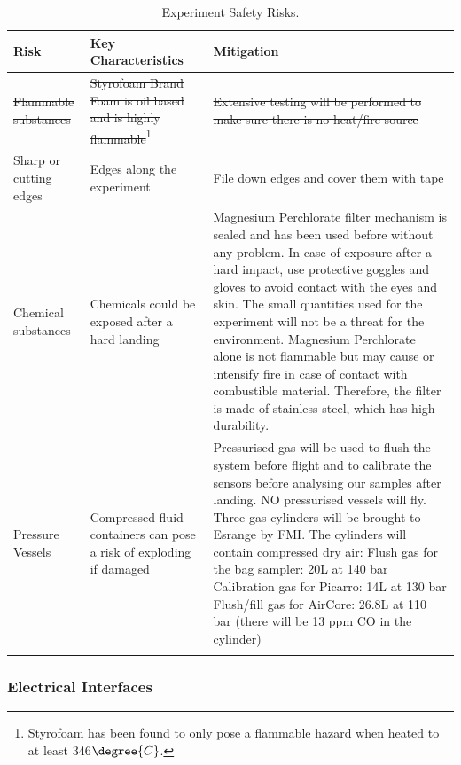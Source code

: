 \documentclass[a4paper,12pt,oneside]{article}
\providecommand{\DIFaddend}{} %
\DeclareRobustCommand{\DIFaddend}{\DIFOaddend \let\includegraphics\DIFOincludegraphics} %
\begin{document}
\DIFaddend \begin{longtable}{|m{}|m{}|m{}|}
\hline
\textbf{Risk} & \textbf{Key Characteristics} & \textbf{Mitigation}                                                           \\ \hline
\st{Flammable substances}    & \st{Styrofoam Brand Foam is oil based and is highly flammable}\footnote{Styrofoam has been found to only pose a flammable hazard when heated to at least 346$\degree{C}$.\cite{dowsverige}\label{fn:keychar}} & \st{Extensive testing will be performed to make sure there is no heat/fire source} \\ \hline
Sharp or cutting edges & Edges along the experiment                                & File down edges and cover them with tape                                                              \\ \hline
Chemical substances & Chemicals could be exposed after a hard landing & Magnesium Perchlorate filter mechanism is sealed and has been used before without any problem. In case of exposure after a hard impact, use protective goggles and gloves to avoid contact with the eyes and skin. The small quantities used for the experiment will not be a threat for the environment. Magnesium Perchlorate alone is not flammable but may cause or intensify fire in case of contact with combustible material. Therefore, the filter is made of stainless steel, which has high durability.       \\ \hline

Pressure Vessels & Compressed fluid containers can pose a risk of exploding if damaged & Pressurised gas will be used to flush the system before flight and to calibrate the sensors before analysing our samples after landing. NO pressurised vessels will fly. 
Three gas cylinders will be brought to Esrange by FMI. The cylinders will contain compressed dry air: \newline
Flush gas for the bag sampler: 20L at 140 bar \newline
Calibration gas for Picarro: 14L at 130 bar \newline
Flush/fill gas for AirCore: 26.8L at 110 bar (there will be 13 ppm CO in the cylinder) \\ \hline

\caption{Experiment Safety Risks.}
\label{tab:safrisk}
\end{longtable}
\raggedbottom

\subsubsection{Electrical Interfaces}
\end{document}
